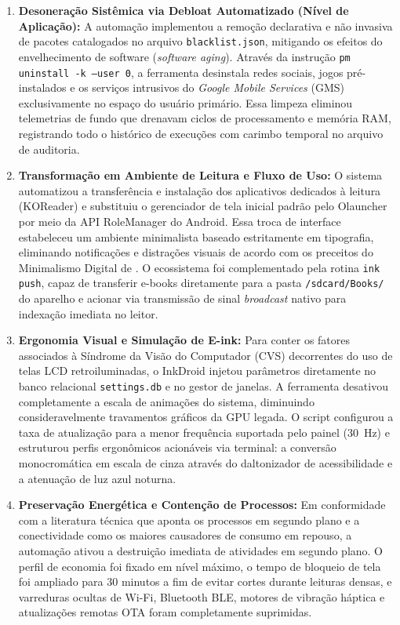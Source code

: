 \documentclass[
    12pt,
    openright,
    oneside,
    a4paper,
    english,
    brazilian
    ]{abntex2}
\begin{document}
\begin{enumerate}

  \item \textbf{Desoneração Sistêmica via Debloat Automatizado (Nível de Aplicação):} A automação implementou a remoção declarativa e não invasiva de pacotes catalogados no arquivo \texttt{blacklist.json}, mitigando os efeitos do envelhecimento de software (\textit{software aging}). Através da instrução \texttt{pm uninstall -k --user 0}, a ferramenta desinstala redes sociais, jogos pré-instalados e os serviços intrusivos do \textit{Google Mobile Services} (GMS) exclusivamente no espaço do usuário primário. Essa limpeza eliminou telemetrias de fundo que drenavam ciclos de processamento e memória RAM, registrando todo o histórico de execuções com carimbo temporal no arquivo de auditoria.

  \item \textbf{Transformação em Ambiente de Leitura e Fluxo de Uso:} O sistema automatizou a transferência e instalação dos aplicativos dedicados à leitura (KOReader) e substituiu o gerenciador de tela inicial padrão pelo Olauncher por meio da API RoleManager do Android. Essa troca de interface estabeleceu um ambiente minimalista baseado estritamente em tipografia, eliminando notificações e distrações visuais de acordo com os preceitos do Minimalismo Digital de . O ecossistema foi complementado pela rotina \texttt{ink push}, capaz de transferir e-books diretamente para a pasta \texttt{/sdcard/Books/} do aparelho e acionar via transmissão de sinal \textit{broadcast} nativo para indexação imediata no leitor.

  \item \textbf{Ergonomia Visual e Simulação de E-ink:} Para conter os fatores associados à Síndrome da Visão do Computador (CVS) decorrentes do uso de telas LCD retroiluminadas, o InkDroid injetou parâmetros diretamente no banco relacional \texttt{settings.db} e no gestor de janelas. A ferramenta desativou completamente a escala de animações do sistema, diminuindo consideravelmente travamentos gráficos da GPU legada. O script configurou a taxa de atualização para a menor frequência suportada pelo painel (30~Hz) e estruturou perfis ergonômicos acionáveis via terminal: a conversão monocromática em escala de cinza através do daltonizador de acessibilidade e a atenuação de luz azul noturna.

  \item \textbf{Preservação Energética e Contenção de Processos:} Em conformidade com a literatura técnica que aponta os processos em segundo plano e a conectividade como os maiores causadores de consumo em repouso, a automação ativou a destruição imediata de atividades em segundo plano. O perfil de economia foi fixado em nível máximo, o tempo de bloqueio de tela foi ampliado para 30 minutos a fim de evitar cortes durante leituras densas, e varreduras ocultas de Wi-Fi, Bluetooth BLE, motores de vibração háptica e atualizações remotas OTA foram completamente suprimidas.


\end{enumerate}
\end{document}
